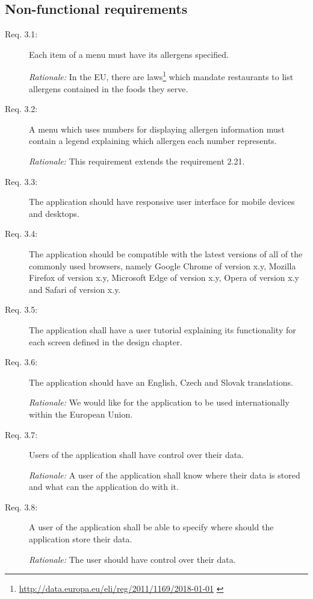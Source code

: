 \newpage

\subsection{Non-functional requirements}
\begin{description}
    \item [Req. 3.1:] Each item of a menu must have its allergens specified.
    
    \emph{Rationale:} In the EU, there are laws\footnote{\url{http://data.europa.eu/eli/reg/2011/1169/2018-01-01}  \label{fnlabel}} which mandate restaurants to list allergens contained in the foods they serve.
    \item [Req. 3.2:] A menu which uses numbers for displaying allergen information must contain a legend explaining which allergen each number represents.

    \emph{Rationale:} This requirement extends the requirement 2.21.
    \item [Req. 3.3:] The application should have responsive user interface for mobile devices and desktops.
    \item [Req. 3.4:] The application should be compatible with the latest versions of all of the commonly used browsers, namely Google Chrome of version x.y, Mozilla Firefox of version x.y, Microsoft Edge of version x.y, Opera of version x.y and Safari of version x.y.
    \item [Req. 3.5:] The application shall have a user tutorial explaining its functionality for each screen defined in the design chapter.
    \item [Req. 3.6:] The application should have an English, Czech and Slovak translations.

    \emph{Rationale:} We would like for the application to be used internationally within the European Union.
    \item [Req. 3.7:] Users of the application shall have control over their data.

    \emph{Rationale:} A user of the application shall know where their data is stored and what can the application do with it.
    \item [Req. 3.8:] A user of the application shall be able to specify where should the application store their data.

    \emph{Rationale:} The user should have control over their data.
\end{description}

\vspace*{\fill}